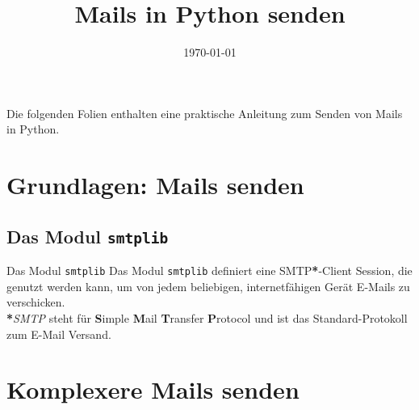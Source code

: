 


\newcommand{\topic}{
	Mails in Python senden
}

\title{\topic}
\supertitle{\course}
\date{\today}



\maketitle

\begin{frame}
	\tableofcontents
\end{frame}


\begin{frame}
	Die folgenden Folien enthalten eine praktische Anleitung zum Senden von Mails in Python.
\end{frame}


\section{Grundlagen: Mails senden}
\subsection{Das Modul \texttt{smtplib}}
\begin{frame}[fragile]{Das Modul \texttt{smtplib}}
	Das Modul \texttt{smtplib} definiert eine SMTP\textbf{*}-Client Session, die genutzt werden kann, um von jedem beliebigen, internetf\"ahigen Ger\"at E-Mails zu verschicken. \\[1cm]
	
	\textbf{*}\textit{SMTP} steht für \textbf{S}imple \textbf{M}ail \textbf{T}ransfer
	\textbf{P}rotocol und ist das Standard-Protokoll zum E-Mail Versand.
\end{frame}


\section{Komplexere Mails senden}
